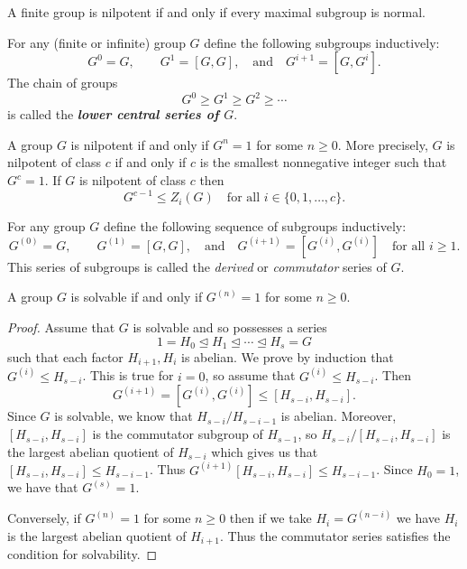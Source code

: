 \nl

\begin{prop}
A finite group is nilpotent if and only if every maximal subgroup is normal.
\end{prop}

\nl

\begin{defn}
For any (finite or infinite) group $G$ define the following subgroups inductively:
\[G^0 = G,\qquad G^1 = [G,G],\quad\text{and}\quad G^{i+1} = [G,G^i].\]
The chain of groups 
\[G^0\geq G^1\geq G^2\geq\cdots\]
is called the \textbf{\textit{lower central series of $G$}}.
\end{defn}

\nl

\begin{thm}
A group $G$ is nilpotent if and only if $G^n = 1$ for some $n\geq 0$. More precisely, $G$ is nilpotent of class $c$ if and only if $c$ is the smallest nonnegative integer such that $G^c = 1$. If $G$ is nilpotent of class $c$ then
\[G^{c-1} \leq Z_i(G)\quad\text{for all } i\in \{0,1,\ldots,c\}.\]
\end{thm}

\nl

\begin{defn}
For any group $G$ define the following sequence of subgroups inductively:
\[G^{(0)} = G,\qquad G^{(1)} = [G,G],\quad\text{and}\quad G^{(i+1)} = [G^{(i)},G^{(i)}]\quad\text{for all }i\geq 1.\]
This series of subgroups is called the \textit{derived} or \textit{commutator} series of $G$.
\end{defn}

\nl

\begin{thm}
A group $G$ is solvable if and only if $G^{(n)} = 1$ for some $n\geq 0$.
\end{thm}

\begin{proof}
Assume that $G$ is solvable and so possesses a series 
\[1 = H_0\unlhd H_1\unlhd \cdots\unlhd H_s = G\]
such that each factor $H_{i+1}, H_i$ is abelian. We prove by induction that $G^{(i)}\leq H_{s-i}$. This is true for $i = 0$, so assume that $G^{(i)}\leq H_{s-i}$. Then
\[G^{(i+1)} = [G^{(i)},G^{(i)}] \leq [H_{s-i},H_{s-i}].\]
Since $G$ is solvable, we know that $H_{s-i}/H_{s-i-1}$ is abelian. Moreover, $[H_{s-i},H_{s-i}]$ is the commutator subgroup of $H_{s-1}$, so $H_{s-i}/[H_{s-i},H_{s-i}]$ is the largest abelian quotient of $H_{s-i}$ which gives us that $[H_{s-i},H_{s-i}]\leq H_{s-i-1}$. Thus $G^{(i+1)} [H_{s-i},H_{s-i}]\leq H_{s-i-1}$. Since $H_0 = 1$, we have that $G^{(s)} = 1$.

Conversely, if $G^{(n)} = 1$ for some $n\geq 0$ then if we take $H_i = G^{(n - i)}$ we have $H_i$ is the largest abelian quotient of $H_{i+1}$. Thus the commutator series satisfies the condition for solvability.
\end{proof}

